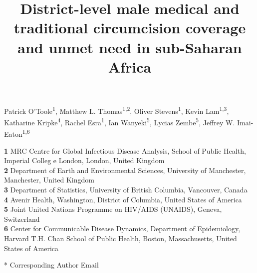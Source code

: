 \documentclass{article}
\title{District-level male medical and traditional circumcision coverage and unmet need in sub-Saharan Africa}
\author{}
\date{}
\begin{document}

\maketitle

\vspace{-1cm}

Patrick O'Toole\textsuperscript{1},
Matthew L. Thomas\textsuperscript{1,2},
Oliver Stevens\textsuperscript{1},
Kevin Lam\textsuperscript{1,3},
Katharine Kripke\textsuperscript{4},
Rachel Esra\textsuperscript{1},
Ian Wanyeki\textsuperscript{5},
Lycias Zembe\textsuperscript{5},
Jeffrey W. Imai-Eaton\textsuperscript{1,6} \\
\smallskip
  
\textbf{1} MRC Centre for Global Infectious Disease Analysis, School of Public Health, Imperial Colleg  e London, London, United Kingdom\\
\textbf{2} Department of Earth and Environmental Sciences, University of Manchester, Manchester, United Kingdom\\
\textbf{3} Department of Statistics, University of British Columbia, Vancouver, Canada\\
\textbf{4} Avenir Health, Washington, District of Columbia, United States of America\\
\textbf{5} Joint United Nations Programme on HIV/AIDS (UNAIDS), Geneva, Switzerland\\
\textbf{6} Center for Communicable Disease Dynamics, Department of Epidemiology, Harvard T.H. Chan School of Public Health, Boston, Massachusetts, United States of America\\

\smallskip

* Corresponding Author Email

\clearpage
\end{document}

